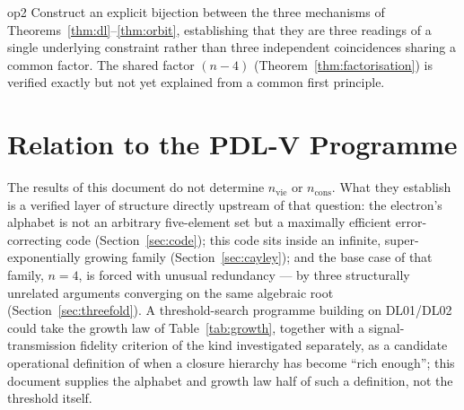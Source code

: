 \documentclass[11pt,a4paper]{article}
\begin{document}
\begin{openprobbox}{}{op2}
Construct an explicit bijection between the three mechanisms of Theorems~\ref{thm:dl}--\ref{thm:orbit}, establishing that they are three readings of a single underlying constraint rather than three independent coincidences sharing a common factor. The shared factor $(n-4)$ (Theorem~\ref{thm:factorisation}) is verified exactly but not yet explained from a common first principle.
\end{openprobbox}

\section{Relation to the PDL-V Programme}
\label{sec:relation}

The results of this document do not determine $n_{\mathrm{vie}}$ or $n_{\mathrm{cons}}$. What they establish is a verified layer of structure directly upstream of that question: the electron's alphabet is not an arbitrary five-element set but a maximally efficient error-correcting code (Section~\ref{sec:code}); this code sits inside an infinite, super-exponentially growing family (Section~\ref{sec:cayley}); and the base case of that family, $n=4$, is forced with unusual redundancy --- by three structurally unrelated arguments converging on the same algebraic root (Section~\ref{sec:threefold}). A threshold-search programme building on DL01/DL02 could take the growth law of Table~\ref{tab:growth}, together with a signal-transmission fidelity criterion of the kind investigated separately, as a candidate operational definition of when a closure hierarchy has become ``rich enough''; this document supplies the alphabet and growth law half of such a definition, not the threshold itself.

\clearpage



\end{document}
